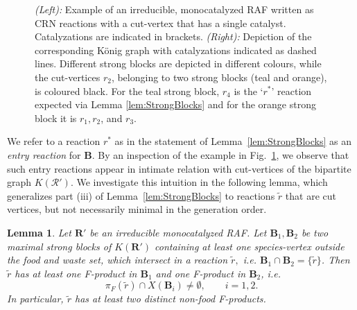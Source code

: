 \documentclass[pdflatex]{sn-jnl}
\theoremstyle{thmstyleone}%
\newtheorem{lemma}[theorem]{Lemma}%
\theoremstyle{examplesty}%
\theoremstyle{thmstylethree}%
\newcommand{\RAF}[0]{\mathbf{R}'}
\newcommand{\block}[0]{\mathbf{B}}
\newcommand{\fproducts}{\pi_F}
\begin{document}
\begin{figure}[bth]
\begin{minipage}[c]{0.55\textwidth}
  \end{minipage}
  \caption{\textit{(Left):} Example of an irreducible, monocatalyzed RAF
    written as CRN reactions with a cut-vertex that has a single
    catalyst. Catalyzations are indicated in brackets. \textit{(Right):}
    Depiction of the corresponding König graph with catalyzations indicated
    as dashed lines. Different strong blocks are depicted in different
    colours, while the cut-vertices $r_2$, belonging to two strong blocks
    (teal and orange), is coloured black. For the teal strong block, $r_4$
    is the `$r^*$' reaction expected via Lemma \ref{lem:StrongBlocks} and
    for the orange strong block it is $r_1, r_2$, and $r_3$.}
  \label{ex:CutVertex2}
\end{figure}

We refer to a reaction $r^*$ as in the statement of
Lemma~\ref{lem:StrongBlocks} as an \emph{entry reaction} for $\block$. By
an inspection of the example in Fig.~\ref{ex:CutVertex2}, we observe
that such entry reactions appear in intimate relation with cut-vertices of
the bipartite graph $K(\mathcal{R}')$. We investigate this intuition in the 
following lemma, which generalizes part (iii) of Lemma~\ref{lem:StrongBlocks} 
to reactions $\tilde{r}$ that are cut vertices, but not necessarily minimal in the 
generation order.
\vspace{6pt}

\begin{lemma}\label{cor:strongblock1}
 Let $\RAF$ be an irreducible monocatalyzed RAF. Let $\block_1, \block_2$ be two maximal
 strong blocks of $K(\RAF)$ containing at least one species-vertex outside
 the food and waste set, which intersect in a reaction $\tilde{r},$ i.e. $\block_1\cap\block_2=\{\tilde{r}\}$. 
 Then $\tilde{r}$ has at least one F-product in $\block_1$ and one F-product in $\block_2$, i.e.
 \[\fproducts(\tilde{r})\cap X(\block_i)\neq\emptyset,\qquad i=1,2.\]
 In particular, $\tilde{r}$ has at least two distinct non-food F-products.
\end{lemma}
\end{document}
